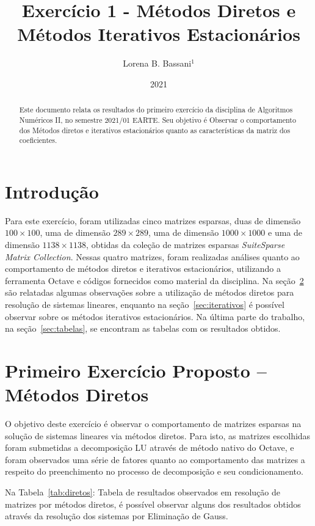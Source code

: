 \documentclass{article}
\title{Exercício 1 - Métodos Diretos e Métodos Iterativos Estacionários}
\author{Lorena B. Bassani$^1$}
\date{2021}
\begin{document}
\maketitle

\begin{abstract}
    Este documento relata os resultados do primeiro exercício da disciplina de Algoritmos Numéricos II, no semestre 2021/01 EARTE. Seu objetivo é Observar o comportamento dos Métodos diretos e iterativos estacionários quanto as características da matriz dos coeficientes.
\end{abstract}

\section{Introdução}
Para este exercício, foram utilizadas cinco matrizes esparsas, duas de dimensão $100\times100$, uma de dimensão $289\times289$, uma de dimensão $1000\times1000$ e uma de dimensão $1138\times1138$, obtidas da coleção de matrizes esparsas \textit{SuiteSparse Matrix Collection}. Nessas quatro matrizes, foram realizadas análises quanto ao comportamento de métodos diretos e iterativos estacionários, utilizando a ferramenta Octave e códigos fornecidos como material da disciplina. Na seção~\ref{sec:diretos} são relatadas algumas observações sobre a utilização de métodos diretos para resolução de sistemas lineares, enquanto na seção~\ref{sec:iterativos} é possível observar sobre os métodos iterativos estacionários. Na última parte do trabalho, na seção~\ref{sec:tabelas}, se encontram as tabelas com os resultados obtidos.

\section{Primeiro Exercício Proposto -- Métodos Diretos}
\label{sec:diretos}
O objetivo deste exercício é observar o comportamento de matrizes esparsas na solução de sistemas lineares via métodos diretos. Para isto, as matrizes escolhidas foram submetidas a decomposição LU através de método nativo do Octave, e foram observados uma série de fatores quanto ao comportamento das matrizes a respeito do preenchimento no processo de decomposição e seu condicionamento.

Na Tabela~\ref{tab:diretos}: Tabela de resultados observados em resolução de matrizes por métodos diretos, é possível observar alguns dos resultados obtidos através da resolução dos sistemas por Eliminação de Gauss.
\end{document}
